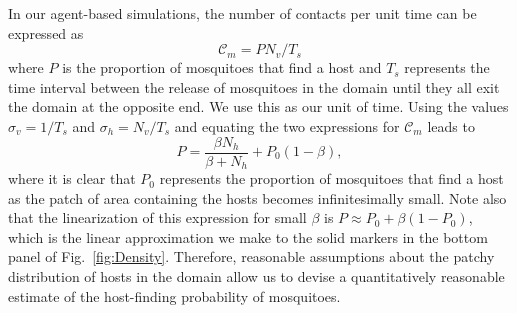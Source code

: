 \documentclass[12pt]{article}
\begin{document}
In our agent-based simulations, the number of contacts per unit time can be expressed as
\[
\mathcal{C}_m = PN_v/T_s
\]
where $P$ is the proportion of mosquitoes that find a host and
$T_s$ represents the time interval between the release of
mosquitoes in the domain until they all exit the domain at the
opposite end.  We use this as our unit of time. Using the
values $\sigma_v = 1/T_s$ and $\sigma_h = N_v/T_s$ and equating
the two expressions for $\mathcal{C}_m$ leads to
\begin{equation*}
	P = \frac{\beta N_h}{\beta + N_h} + P_0(1-\beta),
\end{equation*}
where it is clear that $P_0$ represents the proportion of
mosquitoes that find a host as the patch of area containing the
hosts becomes infinitesimally small.  Note also that the
linearization of this expression for small $\beta$ is $P
\approx P_0 + \beta(1-P_0)$, which is the linear approximation
we make to the solid markers in the bottom panel of
Fig.~\ref{fig:Density}. Therefore, reasonable assumptions about the patchy distribution of hosts  in the domain allow us to devise a quantitatively reasonable estimate of the host-finding probability of mosquitoes.
\end{document}
